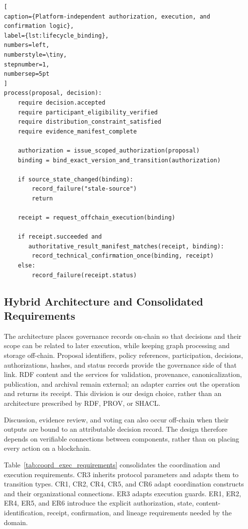 \documentclass[journal]{IEEEtran}
\begin{document}
\begin{lstlisting}[
caption={Platform-independent authorization, execution, and confirmation logic},
label={lst:lifecycle_binding},
numbers=left,
numberstyle=\tiny,
stepnumber=1,
numbersep=5pt
]
process(proposal, decision):
    require decision.accepted
    require participant_eligibility_verified
    require distribution_constraint_satisfied
    require evidence_manifest_complete

    authorization = issue_scoped_authorization(proposal)
    binding = bind_exact_version_and_transition(authorization)

    if source_state_changed(binding):
        record_failure("stale-source")
        return

    receipt = request_offchain_execution(binding)

    if receipt.succeeded and
       authoritative_result_manifest_matches(receipt, binding):
        record_technical_confirmation_once(binding, receipt)
    else:
        record_failure(receipt.status)
\end{lstlisting}

\subsection{Hybrid Architecture and Consolidated Requirements}
\label{sec:onchain_offchain}

The architecture places governance records on-chain so that decisions
and their scope can be related to later execution, while keeping graph
processing and storage off-chain. Proposal identifiers, policy references,
participation, decisions, authorizations, hashes, and status records
provide the governance side of that link. RDF content and the services
for validation, provenance, canonicalization, publication, and archival
remain external; an adapter carries out the operation and returns its
receipt. This division is our design choice, rather than an architecture
prescribed by RDF, PROV, or SHACL.

Discussion, evidence review, and voting can also occur
off-chain when their outputs are bound to an attributable
decision record. The design therefore depends on verifiable
connections between components, rather than on placing
every action on a blockchain.

Table~\ref{tab:coord_exec_requirements} consolidates the
coordination and execution requirements. CR3 inherits protocol
parameters and adapts them to transition types. CR1, CR2,
CR4, CR5, and CR6 adapt coordination constructs and their
organizational connections. ER3 adapts execution guards.
ER1, ER2, ER4, ER5, and ER6 introduce the explicit authorization,
state, content-identification, receipt, confirmation, and
lineage requirements needed by the domain.
\end{document}
